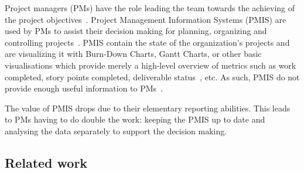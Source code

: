 \documentclass[a4paper, 12pt]{article}
\begin{document}

Project managers (PMs) have the role leading the team towards the achieving of the project objectives~\cite{institute2017guide}. Project Management Information Systems (PMIS) are used by PMs to assist their decision making for planning, organizing and controlling projects~\cite{CANIELS2012162}. PMIS contain the state of the organization's projects and are visualizing it with Burn-Down Charts, Gantt Charts, or other basic visualisations which provide merely a high-level overview of metrics such as work completed, story points completed, deliverable status~\cite{institute2017guide}, etc. As such, PMIS do not provide enough useful information to PMs~\cite{CANIELS2012162}. 

The value of PMIS drops due to their elementary reporting abilities. This leads to PMs having to do double the work: keeping the PMIS up to date and analysing the data separately to support the decision making.




\subsection{Related work}
\end{document}
